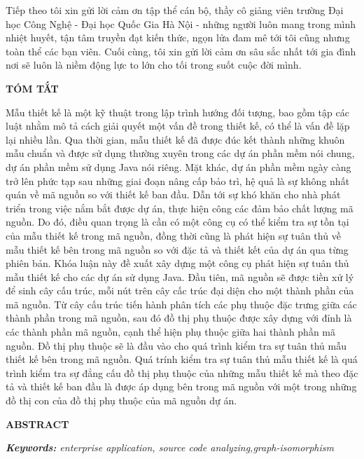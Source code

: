 \documentclass[12pt]{report}
\begin{document}
\noindent Tiếp theo tôi xin gửi lời cảm ơn tập thể cán bộ, thầy cô giảng viên trường Đại học Công Nghệ - Đại học Quốc Gia Hà Nội - những người luôn mang trong mình nhiệt huyết, tận tâm truyền đạt kiến thức, ngọn lửa đam mê tới tôi cũng nhưng toàn thể các bạn viên. Cuối cùng, tôi xin gửi lời cảm ơn sâu sắc nhất tới gia đình nơi sẽ luôn là niềm động lực to lớn cho tối trong suốt cuộc đời mình.

	
\newpage
\begin{center}
	\textbf{\large TÓM TẮT}
\end{center}
Mẫu thiết kế là một kỹ thuật trong lập trình hướng đối tượng, bao gồm tập các luật nhằm mô tả cách giải quyết một vấn đề trong thiết kế, có thể là vấn đề lặp lại nhiều lần. Qua thời gian, mẫu thiết kế đã được đúc kết thành những khuôn mẫu chuẩn và được sử dụng thường xuyên trong các dự án phần mềm nói chung, dự án phần mềm sử dụng Java nói riêng. Mặt khác, dự án phần mềm ngày càng trở lên phức tạp sau những giai đoạn nâng cấp bảo trì, hệ quả là sự không nhất quán về mã nguồn so với thiết kế ban đầu. Dẫn tới sự khó khăn cho nhà phát triển trong việc nắm bắt được dự án, thực hiện công các đảm bảo chất lượng mã nguồn. Do đó, điều quan trọng là cần có một công cụ có thể kiểm tra sự tồn tại của mẫu thiết kế trong mã nguồn, đồng thời cũng là phát hiện sự tuân thủ về mẫu thiết kế bên trong mã nguồn so với đặc tả và thiết kết của dự án qua từng phiên bản. Khóa luận này đề xuất xây dựng một công cụ phát hiện sự tuân thủ mẫu thiết kế cho các dự án sử dụng Java. Đầu tiên, mã nguồn sẽ được tiền xử lý để sinh cây cấu trúc, mỗi nút trên cây cấc trúc đại diện cho một thành phần của mã nguồn. Từ cây cấu trúc tiến hành phân tích các phụ thuộc đặc trưng giữa các thành phần trong mã nguồn, sau đó đồ thị phụ thuộc được xây dựng với đỉnh là các thành phần mã nguồn, cạnh thể hiện phụ thuộc giữa hai thành phần mã nguồn. Đồ thị phụ thuộc sẽ là đầu vào cho quá trình kiểm tra sự tuân thủ mẫu thiết kế bên trong mã nguồn. Quá trính kiểm tra sự tuân thủ mẫu thiết kế là quá trình kiểm tra sự đẳng cấu đồ thị phụ thuộc của những mẫu thiết kế mà theo đặc tả và thiết kế ban đầu là được áp dụng bên trong mã nguồn với một trong những đồ thị con của đồ thị phụ thuộc của mã nguồn dự án.

\newpage
\begin{center}
	\textbf{\large ABSTRACT}
\end{center}


	\noindent \textit{\textbf{Keywords:} enterprise application, source code analyzing,graph-isomorphism}
\end{document}

